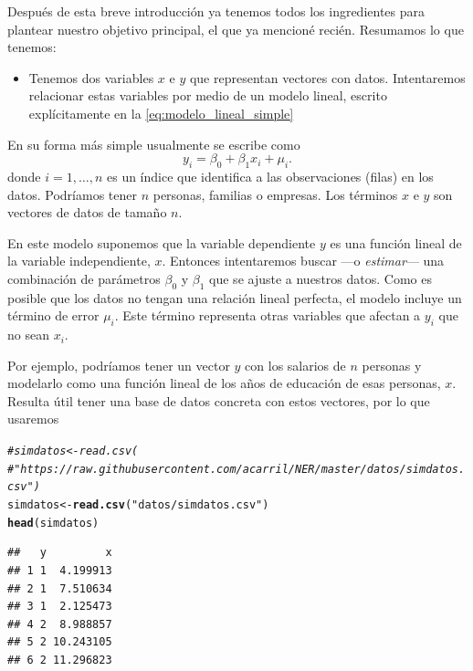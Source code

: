 \documentclass{report}\usepackage[]{graphicx}\usepackage[]{color}
\makeatletter
\newcommand{\hlstr}[1]{\textcolor[rgb]{0.192,0.494,0.8}{#1}}%
\newcommand{\hlcom}[1]{\textcolor[rgb]{0.678,0.584,0.686}{\textit{#1}}}%
\newcommand{\hlstd}[1]{\textcolor[rgb]{0.345,0.345,0.345}{#1}}%
\newcommand{\hlkwb}[1]{\textcolor[rgb]{0.69,0.353,0.396}{#1}}%
\newcommand{\hlkwd}[1]{\textcolor[rgb]{0.737,0.353,0.396}{\textbf{#1}}}%
\newenvironment{kframe}{%
 \def\at@end@of@kframe{}%
 \ifinner\ifhmode%
  \def\at@end@of@kframe{\end{minipage}}%
  \begin{minipage}{\columnwidth}%
 \fi\fi%
 \def\FrameCommand##1{\hskip\@totalleftmargin \hskip-\fboxsep
 \colorbox{shadecolor}{##1}\hskip-\fboxsep
     \hskip-\linewidth \hskip-\@totalleftmargin \hskip\columnwidth}%
 \MakeFramed {\advance\hsize-\width
   \@totalleftmargin\z@ \linewidth\hsize
   \@setminipage}}%
 {\par\unskip\endMakeFramed%
 \at@end@of@kframe}
\newenvironment{knitrout}{}{} %
\makeatother
\begin{document}
Después de esta breve introducción ya tenemos todos los ingredientes para plantear nuestro objetivo principal, el que ya mencioné recién. Resumamos lo que tenemos:

\begin{itemize}
\item Tenemos dos variables $x$ e $y$ que representan vectores con datos. Intentaremos relacionar estas variables por medio de un modelo lineal, escrito explícitamente en la \autoref{eq:modelo_lineal_simple}
\end{itemize}


\hrulefill

En su forma más simple usualmente se escribe como
\begin{equation}
y_i = \beta_0 + \beta_1 x_i + \mu_i.
\label{eq:modelo_lineal_simple}
\end{equation}
donde $i = 1, \ldots, n$ es un índice que identifica a las observaciones (filas) en los datos. Podríamos tener $n$ personas, familias o empresas. Los términos $x$ e $y$ son vectores de datos de tamaño $n$.

En este modelo suponemos que la variable dependiente $y$ es una función lineal de la variable independiente, $x$. Entonces intentaremos buscar ---o \emph{estimar}--- una combinación de parámetros $\beta_0$ y $\beta_1$ que se ajuste a nuestros datos. Como es posible que los datos no tengan una relación lineal perfecta, el modelo incluye un término de error $\mu_i$. Este término representa otras variables que afectan a $y_i$ que no sean $x_i$.

Por ejemplo, podríamos tener un vector $y$ con los salarios de $n$ personas y modelarlo como una función lineal de los años de educación de esas personas, $x$. Resulta útil tener una base de datos concreta con estos vectores, por lo que usaremos 

\begin{knitrout}
\color{fgcolor}\begin{kframe}
\begin{alltt}
\hlcom{#simdatos <- read.csv(}
\hlcom{#  "https://raw.githubusercontent.com/acarril/NER/master/datos/simdatos.csv")}
\hlstd{simdatos} \hlkwb{<-} \hlkwd{read.csv}\hlstd{(}\hlstr{"datos/simdatos.csv"}\hlstd{)}
\hlkwd{head}\hlstd{(simdatos)}
\end{alltt}
\begin{verbatim}
##   y         x
## 1 1  4.199913
## 2 1  7.510634
## 3 1  2.125473
## 4 2  8.988857
## 5 2 10.243105
## 6 2 11.296823
\end{verbatim}
\end{kframe}
\end{knitrout}
\end{document}
